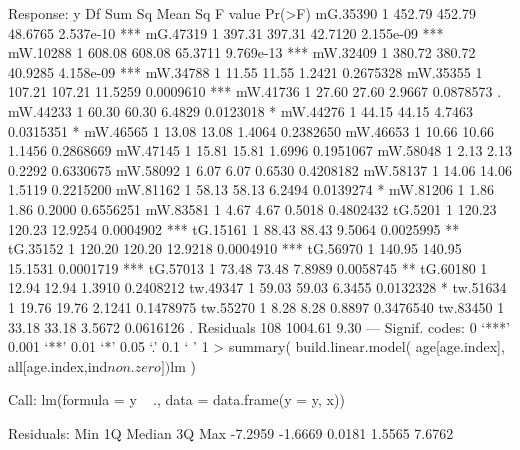 Response: y
           Df  Sum Sq Mean Sq F value    Pr(>F)    
mG.35390    1  452.79  452.79 48.6765 2.537e-10 ***
mG.47319    1  397.31  397.31 42.7120 2.155e-09 ***
mW.10288    1  608.08  608.08 65.3711 9.769e-13 ***
mW.32409    1  380.72  380.72 40.9285 4.158e-09 ***
mW.34788    1   11.55   11.55  1.2421 0.2675328    
mW.35355    1  107.21  107.21 11.5259 0.0009610 ***
mW.41736    1   27.60   27.60  2.9667 0.0878573 .  
mW.44233    1   60.30   60.30  6.4829 0.0123018 *  
mW.44276    1   44.15   44.15  4.7463 0.0315351 *  
mW.46565    1   13.08   13.08  1.4064 0.2382650    
mW.46653    1   10.66   10.66  1.1456 0.2868669    
mW.47145    1   15.81   15.81  1.6996 0.1951067    
mW.58048    1    2.13    2.13  0.2292 0.6330675    
mW.58092    1    6.07    6.07  0.6530 0.4208182    
mW.58137    1   14.06   14.06  1.5119 0.2215200    
mW.81162    1   58.13   58.13  6.2494 0.0139274 *  
mW.81206    1    1.86    1.86  0.2000 0.6556251    
mW.83581    1    4.67    4.67  0.5018 0.4802432    
tG.5201     1  120.23  120.23 12.9254 0.0004902 ***
tG.15161    1   88.43   88.43  9.5064 0.0025995 ** 
tG.35152    1  120.20  120.20 12.9218 0.0004910 ***
tG.56970    1  140.95  140.95 15.1531 0.0001719 ***
tG.57013    1   73.48   73.48  7.8989 0.0058745 ** 
tG.60180    1   12.94   12.94  1.3910 0.2408212    
tw.49347    1   59.03   59.03  6.3455 0.0132328 *  
tw.51634    1   19.76   19.76  2.1241 0.1478975    
tw.55270    1    8.28    8.28  0.8897 0.3476540    
tw.83450    1   33.18   33.18  3.5672 0.0616126 .  
Residuals 108 1004.61    9.30                      
---
Signif. codes:  0 ‘***’ 0.001 ‘**’ 0.01 ‘*’ 0.05 ‘.’ 0.1 ‘ ’ 1
> summary(  build.linear.model( age[age.index], all[age.index,ind$non.zero])$lm )

Call:
lm(formula = y ~ ., data = data.frame(y = y, x))

Residuals:
    Min      1Q  Median      3Q     Max 
-7.2959 -1.6669  0.0181  1.5565  7.6762 

